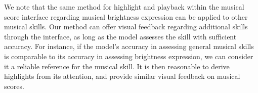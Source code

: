 We note that the same method for highlight and playback within the musical score interface regarding musical brightness expression can be applied to other musical skills. 
Our method can offer visual feedback regarding additional skills through the interface, as long as the model assesses the skill with sufficient accuracy. 
For instance, if the model's accuracy in assessing general musical skills is comparable to its accuracy in assessing brightness expression, we can consider it a reliable reference for the musical skill.
It is then reasonable to derive highlights from its attention, and provide similar visual feedback on musical scores.